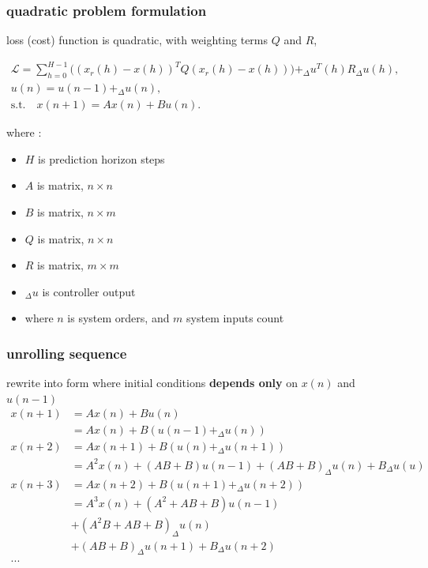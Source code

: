 \documentclass{beamer}
\begin{document}
\begin{frame}
  
  \frametitle{\bf quadratic problem formulation}

  loss (cost) function is quadratic, with weighting terms $Q$ and $R$,

  \begin{align*}
    \mathcal{L} = \sum_{h=0}^{H-1} \big((x_r(h) - x(h))^T Q (x_r(h) - x(h))\big) +_{\Delta}u^T(h)R_{\Delta}u(h), \\
    u(n) = u(n-1)+_{\Delta}u(n), \\
    \text{s.t.} \quad x(n+1) = Ax(n) + Bu(n).
  \end{align*}

  where : 
  \begin{itemize}
    \item $H$ is prediction horizon steps
    \item $A$ is matrix, $n \times n$
    \item $B$ is matrix, $n \times m$
    \item $Q$ is matrix, $n \times n$
    \item $R$ is matrix, $m \times m$
    \item $_{\Delta}u$ is controller output
    \item where $n$ is system orders, and $m$ system inputs count
  \end{itemize}

  
\end{frame}


\begin{frame}
  
  \frametitle{\bf unrolling sequence}
  rewrite into form where initial conditions {\bf depends only} on $x(n)$ and $u(n-1)$ 
  \begin{align*}
    x(n+1)&= Ax(n) + Bu(n) \\
          &= Ax(n) + B(u(n-1) + _\Delta u(n)) \\
    x(n+2)&= Ax(n+1) + B(u(n) + _\Delta u(n+1)) \\
          &= A^2x(n) + (AB + B)u(n-1) + (AB+B)_\Delta u(n) + B_\Delta u(u) \\
    x(n+3)&= Ax(n+2) + B(u(n+1) + _\Delta u(n+2)) \\
          &= A^3x(n) + (A^2 + AB + B)u(n-1) \\
          & + (A^2B + AB + B)_\Delta u(n) \\
          & + (AB + B)_\Delta u(n+1) + B_\Delta u(n+2) \\
    ... 
  \end{align*}  

  
\end{frame}
\end{document}
